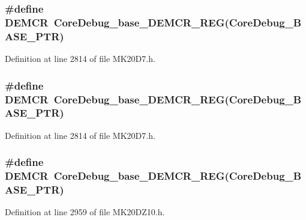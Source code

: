 \subsubsection[{\texorpdfstring{D\+E\+M\+CR}{DEMCR}}]{\setlength{\rightskip}{0pt plus 5cm}\#define D\+E\+M\+CR~{\bf Core\+Debug\+\_\+base\+\_\+\+D\+E\+M\+C\+R\+\_\+\+R\+EG}({\bf Core\+Debug\+\_\+\+B\+A\+S\+E\+\_\+\+P\+TR})}\hypertarget{group___core_debug___register___accessor___macros_gab6c5b1baf444f12ba50bfc3b0e40e05c}{}\label{group___core_debug___register___accessor___macros_gab6c5b1baf444f12ba50bfc3b0e40e05c}


Definition at line 2814 of file M\+K20\+D7.\+h.

\subsubsection[{\texorpdfstring{D\+E\+M\+CR}{DEMCR}}]{\setlength{\rightskip}{0pt plus 5cm}\#define D\+E\+M\+CR~{\bf Core\+Debug\+\_\+base\+\_\+\+D\+E\+M\+C\+R\+\_\+\+R\+EG}({\bf Core\+Debug\+\_\+\+B\+A\+S\+E\+\_\+\+P\+TR})}\hypertarget{group___core_debug___register___accessor___macros_gab6c5b1baf444f12ba50bfc3b0e40e05c}{}\label{group___core_debug___register___accessor___macros_gab6c5b1baf444f12ba50bfc3b0e40e05c}


Definition at line 2814 of file M\+K20\+D7.\+h.

\subsubsection[{\texorpdfstring{D\+E\+M\+CR}{DEMCR}}]{\setlength{\rightskip}{0pt plus 5cm}\#define D\+E\+M\+CR~{\bf Core\+Debug\+\_\+base\+\_\+\+D\+E\+M\+C\+R\+\_\+\+R\+EG}({\bf Core\+Debug\+\_\+\+B\+A\+S\+E\+\_\+\+P\+TR})}\hypertarget{group___core_debug___register___accessor___macros_gab6c5b1baf444f12ba50bfc3b0e40e05c}{}\label{group___core_debug___register___accessor___macros_gab6c5b1baf444f12ba50bfc3b0e40e05c}


Definition at line 2959 of file M\+K20\+D\+Z10.\+h.

